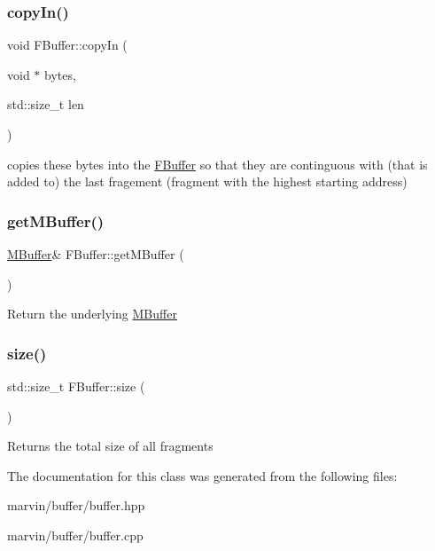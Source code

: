 \subsubsection{\texorpdfstring{copy\+In()}{copyIn()}}
{\footnotesize\ttfamily void F\+Buffer\+::copy\+In (\begin{DoxyParamCaption}\item[{void $\ast$}]{bytes,  }\item[{std\+::size\+\_\+t}]{len }\end{DoxyParamCaption})}

copies these bytes into the \hyperlink{class_f_buffer}{F\+Buffer} so that they are continguous with (that is added to) the last fragement (fragment with the highest starting address) \mbox{\label{class_f_buffer_a0987483eef377d599dcae38a6aac5236}} 
\subsubsection{\texorpdfstring{get\+M\+Buffer()}{getMBuffer()}}
{\footnotesize\ttfamily \hyperlink{struct_m_buffer}{M\+Buffer}\& F\+Buffer\+::get\+M\+Buffer (\begin{DoxyParamCaption}{ }\end{DoxyParamCaption})}

Return the underlying \hyperlink{struct_m_buffer}{M\+Buffer} \mbox{\label{class_f_buffer_ae5f30d510287df8185bc30ecfd80840e}} 
\subsubsection{\texorpdfstring{size()}{size()}}
{\footnotesize\ttfamily std\+::size\+\_\+t F\+Buffer\+::size (\begin{DoxyParamCaption}{ }\end{DoxyParamCaption})}

Returns the total size of all fragments 

The documentation for this class was generated from the following files\+:\begin{DoxyCompactItemize}
\item 
marvin/buffer/buffer.\+hpp\item 
marvin/buffer/buffer.\+cpp\end{DoxyCompactItemize}
